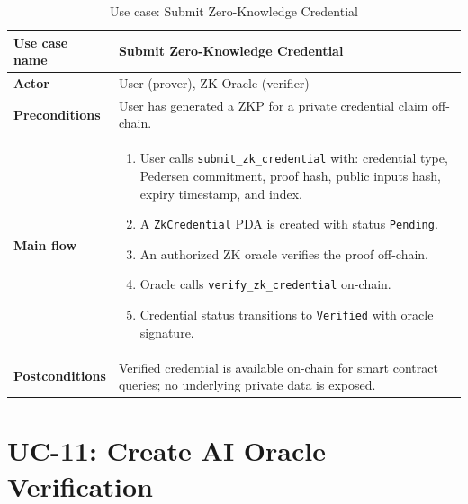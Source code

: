 \begin{table}[H]
\centering
\caption{Use case: Submit Zero-Knowledge Credential}
\begin{tabular}{|l|p{10cm}|}
\hline
\textbf{Use case name} & Submit Zero-Knowledge Credential \\ \hline
\textbf{Actor} & User (prover), ZK Oracle (verifier) \\ \hline
\textbf{Preconditions} & User has generated a ZKP for a private credential claim off-chain. \\ \hline
\textbf{Main flow} & \begin{enumerate}[noitemsep]
    \item User calls \texttt{submit\_zk\_credential} with: credential type, Pedersen commitment, proof hash, public inputs hash, expiry timestamp, and index.
    \item A \texttt{ZkCredential} PDA is created with status \texttt{Pending}.
    \item An authorized ZK oracle verifies the proof off-chain.
    \item Oracle calls \texttt{verify\_zk\_credential} on-chain.
    \item Credential status transitions to \texttt{Verified} with oracle signature.
\end{enumerate} \\ \hline
\textbf{Postconditions} & Verified credential is available on-chain for smart contract queries; no underlying private data is exposed. \\ \hline
\end{tabular}
\end{table}

\section*{UC-11: Create AI Oracle Verification}

